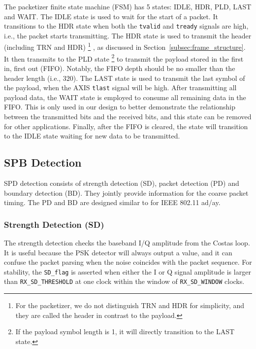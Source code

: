 \documentclass[journal,twoside]{IEEEtran}
\begin{document}
      The packetizer finite state machine (FSM) has 5 states: IDLE, HDR, PLD, LAST and WAIT.
      The IDLE state is used to wait for the start of a packet.
      It transitions to the HDR state when both the \texttt{tvalid} and \texttt{tready} signals are high,
      i.e., the packet starts transmitting.
      The HDR state is used to transmit the header (including TRN and HDR)%
      \footnote{For the packetizer, we do not distinguish TRN and HDR for simplicity,
      and they are called the header in contrast to the payload.}%
      , as discussed in Section~\ref{subsec:frame_structure}.
      It then transmits to the PLD state%
      \footnote{If the payload symbol length is 1, it will directly transition to the LAST state.}
      to transmit the payload stored in the first in, first out (FIFO).
      Notably, the FIFO depth should be no smaller than the header length (i.e., $320$).
      The LAST state is used to transmit the last symbol of the payload,
      when the AXIS \texttt{tlast} signal will be high.
      After transmitting all payload data,
      the WAIT state is employed to consume all remaining data in the FIFO.
      This is only used in our design to better demonstrate the relationship between the transmitted bits and the received bits,
      and this state can be removed for other applications.
      Finally, after the FIFO is cleared, the state will transition to the IDLE state waiting for new data to be transmitted.

    \subsection{SPB Detection}

      SPD detection consists of strength detection (SD),
      packet detection (PD) and boundary detection (BD).
      They jointly provide information for the coarse packet timing.
      The PD and BD are designed similar to \cite{lacruz2021real} for IEEE 802.11 ad/ay.

      \subsubsection{Strength Detection (SD)}
      The strength detection checks the baseband I/Q amplitude from the Costas loop.
      It is useful because the PSK detector will always output a value,
      and it can confuse the packet parsing when the noise coincides with the packet sequence.
      For stability, the \texttt{SD\_flag} is asserted when
      either the I or Q signal amplitude is larger than \texttt{RX\_SD\_THRESHOLD}
      at one clock within the window of \texttt{RX\_SD\_WINDOW} clocks.
\end{document}
